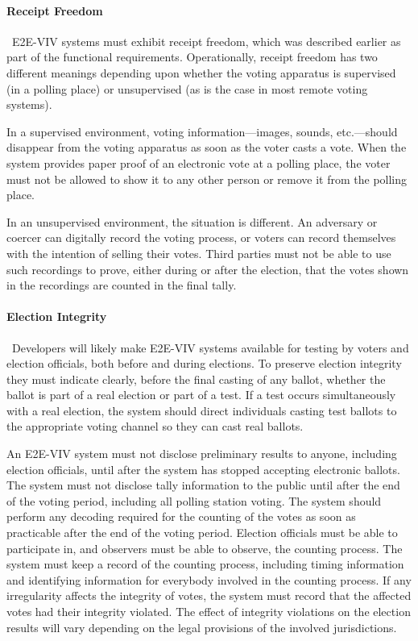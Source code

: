 \paragraph{Receipt Freedom} \ E2E-VIV systems must exhibit receipt
freedom, which was described earlier as part of the functional
requirements. Operationally, receipt freedom has two different
meanings depending upon whether the voting apparatus is supervised (in
a polling place) or unsupervised (as is the case in most remote voting
systems).

In a supervised environment, voting information---images, sounds,
etc.---should disappear from the voting apparatus as soon as the voter
casts a vote. When the system provides paper proof of an electronic
vote at a polling place, the voter must not be allowed to show it to
any other person or remove it from the polling place.

In an unsupervised environment, the situation is different. An
adversary or coercer can digitally record the voting process, or
voters can record themselves with the intention of selling their
votes. Third parties must not be able to use such recordings to prove,
either during or after the election, that the votes shown in the
recordings are counted in the final tally.

\paragraph{Election Integrity} \ Developers will likely make E2E-VIV
systems available for testing by voters and election officials, both
before and during elections. To preserve election integrity they must
indicate clearly, before the final casting of any ballot, whether the
ballot is part of a real election or part of a test. If a test occurs
simultaneously with a real election, the system should direct
individuals casting test ballots to the appropriate voting channel so
they can cast real ballots.

An E2E-VIV system must not disclose preliminary results to anyone,
including election officials, until after the system has stopped
accepting electronic ballots. The system must not disclose tally
information to the public until after the end of the voting period,
including all polling station voting. The system should perform any
decoding required for the counting of the votes as soon as practicable
after the end of the voting period. Election officials must be able to
participate in, and observers must be able to observe, the counting
process. The system must keep a record of the counting process,
including timing information and identifying information for everybody
involved in the counting process. If any irregularity affects the
integrity of votes, the system must record that the affected votes had
their integrity violated. The effect of integrity violations on the
election results will vary depending on the legal provisions of the
involved jurisdictions.

